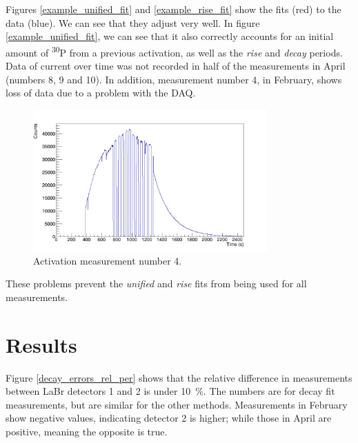 \documentclass[a4paper,12pt]{report}
\newcommand{\Piso}{\textsuperscript{30}P }
\begin{document}
Figures \ref{example_unified_fit} and \ref{example_rise_fit} show the fits (red) to the data (blue).
We can see that they adjust very well.
In figure \ref{example_unified_fit}, we can see that it also correctly accounts for an initial amount of \Piso from a previous activation, as well as the \textit{rise} and \textit{decay} periods.
\\

Data of current over time was not recorded in half of the measurements in April (numbers 8, 9 and 10).	%
In addition, measurement number 4, in February, shows loss of data due to a problem with the DAQ.

\begin{figure}[H]
	\centering
	\includegraphics[width=0.80\textwidth]{activation_4_time.png}
	\caption{Activation measurement number 4.}
	\label{activation_4_time}
\end{figure}

These problems prevent the \textit{unified} and \textit{rise} fits from being used for all measurements.
\\

\section{Results}
Figure \ref{decay_errors_rel_per} shows that the relative difference in measurements between LaBr detectors 1 and 2 is under \qty{10}{\percent}.
The numbers are for decay fit measurements, but are similar for the other methods.
Measurements in February show negative values, indicating detector 2 is higher; while those in April are positive, meaning the opposite is true.
\end{document}
